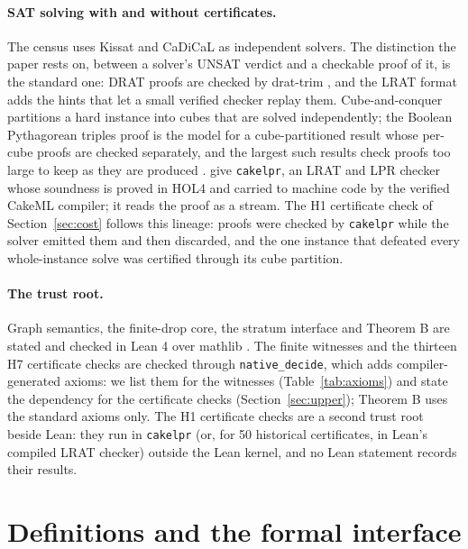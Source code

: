 \documentclass{anvil-paper}
\newcommand{\cakelpr}{\texttt{cake\textunderscore lpr}}
\theoremstyle{definition}
\begin{document}
\paragraph{SAT solving with and without certificates.} The census uses Kissat \citep{biere2024kissat} and CaDiCaL \citep{biere2020cadical} as independent solvers. The distinction the paper rests on, between a solver's UNSAT verdict and a checkable proof of it, is the standard one: DRAT proofs are checked by drat-trim \citep{wetzler2014drat}, and the LRAT format \citep{cruzfilipe2017lrat} adds the hints that let a small verified checker replay them. Cube-and-conquer \citep{heule2011cube} partitions a hard instance into cubes that are solved independently; the Boolean Pythagorean triples proof \citep{heule2016pythagorean} is the model for a cube-partitioned result whose per-cube proofs are checked separately, and the largest such results check proofs too large to keep as they are produced \citep{heule2016pythagorean,heule2018schur}. \citet{tan2021cakelpr} give \cakelpr{}, an LRAT and LPR checker whose soundness is proved in HOL4 and carried to machine code by the verified CakeML compiler; it reads the proof as a stream. The H1 certificate check of Section~\ref{sec:cost} follows this lineage: proofs were checked by \cakelpr{} while the solver emitted them and then discarded, and the one instance that defeated every whole-instance solve was certified through its cube partition.

\paragraph{The trust root.} Graph semantics, the finite-drop core, the stratum interface and Theorem B are stated and checked in Lean 4 \citep{moura2021lean4} over mathlib \citep{mathlib2020}. The finite witnesses and the thirteen H7 certificate checks are checked through \texttt{native\_decide}, which adds compiler-generated axioms: we list them for the witnesses (Table~\ref{tab:axioms}) and state the dependency for the certificate checks (Section~\ref{sec:upper}); Theorem B uses the standard axioms only. The H1 certificate checks are a second trust root beside Lean: they run in \cakelpr{} (or, for 50 historical certificates, in Lean's compiled LRAT checker) outside the Lean kernel, and no Lean statement records their results.

\section{Definitions and the formal interface}\label{sec:prelim}
\end{document}
